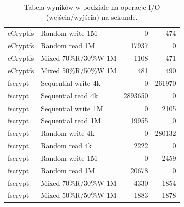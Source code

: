 \documentclass[a4paper]{article}
\begin{document}
\begin{table}[H]
\begin{tabular}{|l|l|r|r|}
        eCryptfs & Random write 1M  & 0 & 474 \\
        eCryptfs & Random read 1M  & 17937 & 0 \\
        eCryptfs & Mixed 70\%R/30\%W 1M  & 1108 & 471 \\
        eCryptfs & Mixed 50\%R/50\%W 1M  & 481 & 490 \\
        fscrypt & Sequential write 4k & 0 & 261970 \\
        fscrypt & Sequential read 4k & 2893650 & 0 \\
        fscrypt & Sequential write 1M & 0 & 2105 \\
        fscrypt & Sequential read 1M & 19955 & 0 \\
        fscrypt & Random write 4k & 0 & 280132 \\
        fscrypt & Random read 4k & 2222 & 0 \\
        fscrypt & Random write 1M & 0 & 2459 \\
        fscrypt & Random read 1M & 20678 & 0 \\
        fscrypt & Mixed 70\%R/30\%W 1M & 4330 & 1854 \\
        fscrypt & Mixed 50\%R/50\%W 1M & 1883 & 1878 \\
        \hline
    \end{tabular}
    \caption{Tabela wyników w podziale na operacje I/O (wejścia/wyjścia) na sekundę.}
    \label{tab:fio_iops}
\end{table}
\end{document}
